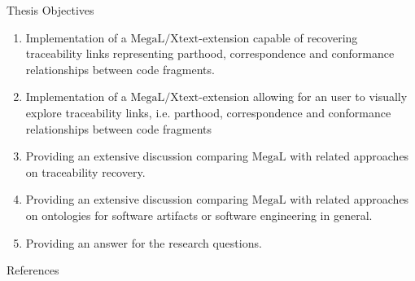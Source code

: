 \documentclass{beamer}
\newcommand{\megal}{\text{MegaL}}
\newcommand{\megalxtext}{\text{MegaL/Xtext}}
\begin{document}
\begin{frame}{Thesis Objectives}
\small
\begin{enumerate}[TO1]
\item
Implementation of a $\megalxtext$-extension capable of recovering traceability links representing parthood, correspondence and conformance relationships between code fragments.

\item
Implementation of a $\megalxtext$-extension allowing for an user to visually explore traceability links, i.e. parthood, correspondence and conformance relationships between code fragments

\item
Providing an extensive discussion comparing $\megal$\cite{DBLP:conf/models/FavreLV12} with related approaches on traceability recovery.

\item
Providing an extensive discussion comparing $\megal$\cite{DBLP:conf/models/FavreLV12} with related approaches on ontologies for software artifacts or software engineering in general.

\item
Providing an answer for the research questions.
\end{enumerate}
\end{frame}

\begin{frame}[allowframebreaks]{References}
\scriptsize{}
{}
\end{frame}
\end{document}
